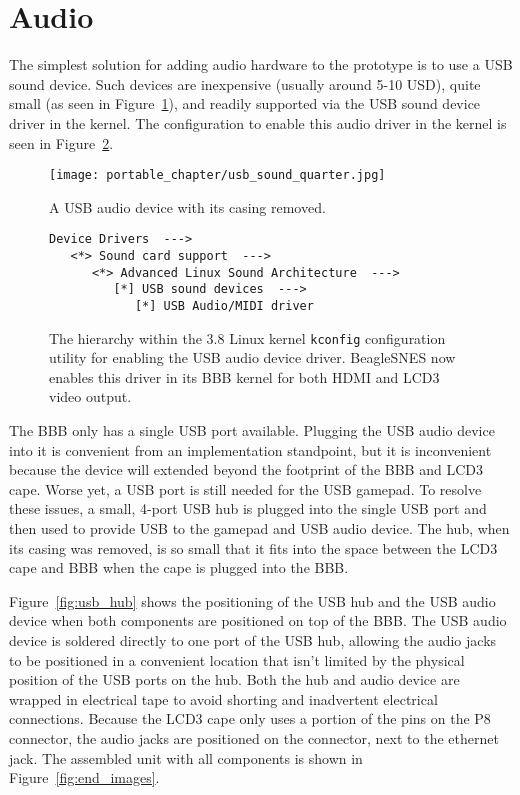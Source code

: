 \section{Audio}

The simplest solution for adding audio hardware to the prototype is to use a USB sound device. Such devices are inexpensive (usually around 5-10 USD), quite small (as seen in Figure~\ref{fig:usb_sound}), and readily supported via the USB sound device driver in the kernel.  The configuration to enable this audio driver in the kernel is seen in Figure~\ref{fig:kconfig_audio}.

\begin{figure}[h]
\centering\texttt{[image: portable\_chapter/usb\_sound\_quarter.jpg]} 
\caption{A USB audio device with its casing removed.}\label{fig:usb_sound}
\end{figure}

\begin{figure}[h]
\begin{verbatim}Device Drivers  --->
   <*> Sound card support  --->
      <*> Advanced Linux Sound Architecture  --->
         [*] USB sound devices  --->
            [*] USB Audio/MIDI driver\end{verbatim}
\caption{The hierarchy within the 3.8 Linux kernel \texttt{kconfig} configuration utility for enabling the USB audio device driver.  BeagleSNES now enables this driver in its BBB kernel for both HDMI and LCD3 video output.}\label{fig:kconfig_audio}
\end{figure}

The BBB only has a single USB port available.  Plugging the USB audio device into it is convenient from an implementation standpoint, but it is inconvenient because the device will extended beyond the footprint of the BBB and LCD3 cape.  Worse yet, a USB port is still needed for the USB gamepad. To resolve these issues, a small, 4-port USB hub is plugged into the single USB port and then used to provide USB to the gamepad and USB audio device.  The hub, when its casing was removed, is so small that it fits into the space between the LCD3 cape and BBB when the cape is plugged into the BBB.

Figure~\ref{fig:usb_hub} shows the positioning of the USB hub and the USB audio device when both components are positioned on top of the BBB.  The USB audio device is soldered directly to one port of the USB hub, allowing the audio jacks to be positioned in a convenient location that isn't limited by the physical position of the USB ports on the hub.  Both the hub and audio device are wrapped in electrical tape to avoid shorting and inadvertent electrical connections.  Because the LCD3 cape only uses a portion of the pins on the P8 connector, the audio jacks are positioned on the connector, next to the ethernet jack.  The assembled unit with all components is shown in Figure~\ref{fig:end_images}.

